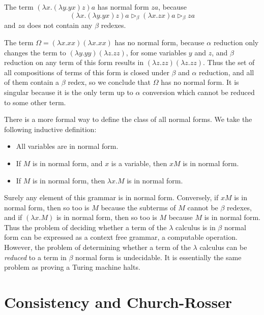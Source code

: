 \begin{example}
    The term $(\lambda x.(\lambda y.yx)z)a$ has normal form $za$, because
    \[ (\lambda x.(\lambda y.yx)z)a \rhd_\beta (\lambda x.zx)a \rhd_\beta za \]
    and $za$ does not contain any $\beta$ redexes.
\end{example}

\begin{example}
    The term $\Omega = (\lambda x.xx)(\lambda x.xx)$ has no normal form, because $\alpha$ reduction only changes the term to $(\lambda y.yy)(\lambda z.zz)$, for some variables $y$ and $z$, and $\beta$ reduction on any term of this form results in $(\lambda z.zz)(\lambda z.zz)$. Thus the set of all compositions of terms of this form is closed under $\beta$ and $\alpha$ reduction, and all of them contain a $\beta$ redex, so we conclude that $\Omega$ has no normal form. It is singular because it is the only term up to $\alpha$ conversion which cannot be reduced to some other term.
\end{example}

There is a more formal way to define the class of all normal forms. We take the following inductive definition:
%
\begin{itemize}
    \item All variables are in normal form.
    \item If $M$ is in normal form, and $x$ is a variable, then $xM$ is in normal form.
    \item If $M$ is in normal form, then $\lambda x.M$ is in normal form.
\end{itemize}
%
Surely any element of this grammar is in normal form. Conversely, if $xM$ is in normal form, then so too is $M$ because the subterms of $M$ cannot be $\beta$ redexes, and if $(\lambda x.M)$ is in normal form, then so too is $M$ because $M$ is in normal form. Thus the problem of deciding whether a term of the $\lambda$ calculus is in $\beta$ normal form can be expressed as a context free grammar, a computable operation. However, the problem of determining whether a term of the $\lambda$ calculus can be {\it reduced} to a term in $\beta$ normal form is undecidable. It is essentially the same problem as proving a Turing machine halts.

\section{Consistency and Church-Rosser}

